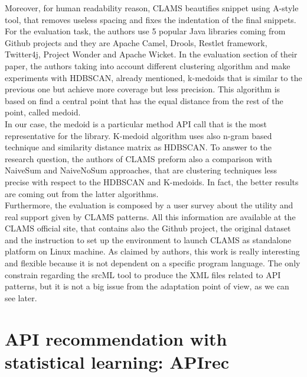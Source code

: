 Moreover, for human readability reason, CLAMS beautifies snippet using A-style tool, that removes useless spacing and fixes the indentation of the final snippets. For the evaluation task, the authors use 5 popular Java libraries coming from Github projects and they are Apache Camel, Drools, Restlet framework, Twitter4j, Project Wonder and Apache Wicket. In the evaluation section of their paper, the authors taking into account different clustering algorithm and make experiments with HDBSCAN, already mentioned, k-medoids that is similar to the previous one but achieve more coverage but less precision. This algorithm is based on find a central point that has the equal distance from the rest of the point, called medoid. \\
In our case, the medoid is a particular method API call that is the most representative for the library. K-medoid algorithm uses also n-gram based technique and similarity distance matrix as HDBSCAN. To answer to the research question, the authors of CLAMS preform also a comparison with NaiveSum and NaiveNoSum approaches, that are clustering techniques less precise with respect to the HDBSCAN and K-medoids. In fact, the better results are coming out from the latter algorithms. \\
Furthermore, the evaluation is composed by a user survey about the utility and real support given by CLAMS patterns. All this information are available at the CLAMS official site, that contains also the Github project, the original dataset and the instruction to set up the environment to launch CLAMS as standalone platform on Linux machine. As claimed by authors, this work is really interesting and flexible because it is not dependent on a specific program language. The only constrain regarding the srcML tool to produce the XML files related to API patterns, but it is not a big issue from the adaptation point of view, as we can see later.



\section{API recommendation with statistical learning: APIrec}

